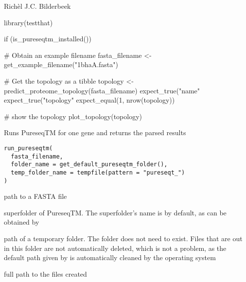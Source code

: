 \documentclass[letterpaper]{book}
\begin{document}
%
\begin{Author}\relax
Richèl J.C. Bilderbeek
\end{Author}
%
\begin{Examples}
\begin{ExampleCode}
library(testthat)

if (is_pureseqtm_installed()) {
  # Obtain an example filename
  fasta_filename <- get_example_filename("1bhaA.fasta")

  # Get the topology as a tibble
  topology <- predict_proteome_topology(fasta_filename)
  expect_true("name" %
  expect_true("topology" %
  expect_equal(1, nrow(topology))

  # show the topology
  plot_topology(topology)
}
\end{ExampleCode}
\end{Examples}
%
\begin{Description}\relax
Runs PureseqTM for one gene and returns the parsed results
\end{Description}
%
\begin{Usage}
\begin{verbatim}
run_pureseqtm(
  fasta_filename,
  folder_name = get_default_pureseqtm_folder(),
  temp_folder_name = tempfile(pattern = "pureseqt_")
)
\end{verbatim}
\end{Usage}
%
\begin{Arguments}
\begin{ldescription}
\item[\code{fasta\_filename}] path to a FASTA file

\item[\code{folder\_name}] superfolder of PureseqTM.
The superfolder's name is 
by default, as can be obtained by

\item[\code{temp\_folder\_name}] path of a temporary folder.
The folder does not need to exist.
Files that are out in this folder are not automatically
deleted, which is not a problem, as the default
path given by  is automatically cleaned
by the operating system
\end{ldescription}
\end{Arguments}
%
\begin{Value}
full path to the files created
\end{Value}
\end{document}
